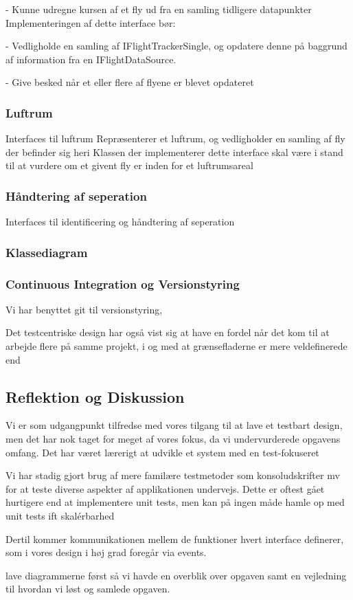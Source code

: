 - Kunne udregne kursen af et fly ud fra en samling tidligere datapunkter
Implementeringen af dette interface bør:

- Vedligholde en samling af IFlightTrackerSingle, og opdatere denne på baggrund af information fra en IFlightDataSource.

- Give besked når et eller flere af flyene er blevet opdateret
\newpage
\subsubsection{Luftrum}

{Interfaces til luftrum}
Repræsenterer et luftrum, og vedligholder en samling af fly der befinder sig heri
Klassen der implementerer dette interface skal være i stand til at vurdere om et givent fly er inden for et luftrumsareal
\subsubsection{Håndtering af seperation}
{Interfaces til identificering og håndtering af seperation}

\subsubsection{Klassediagram}


\subsubsection{Continuous Integration og Versionstyring}

Vi har benyttet git til versionstyring, 

Det testcentriske design har også vist sig at have en fordel når det kom til at arbejde flere på samme projekt, i og med at grænsefladerne er mere veldefinerede end



\subsection{Reflektion og Diskussion}
Vi er som udgangpunkt tilfredse med vores tilgang til at lave et testbart design, men det har nok taget for meget af vores fokus, da vi undervurderede opgavens omfang. 
Det har været lærerigt at udvikle et system med en test-fokuseret

Vi har stadig gjort brug af mere familære testmetoder som konsoludskrifter mv for at teste diverse aspekter af applikationen undervejs. 
Dette er oftest gået hurtigere end at implementere unit tests, men kan på ingen måde hamle op med unit tests ift skalérbarhed

Dertil kommer kommunikationen mellem de funktioner hvert interface definerer, som i vores design i høj grad foregår via events.

lave diagrammerne først så vi havde en overblik over opgaven samt en vejledning til hvordan vi løst og samlede opgaven. 

 

